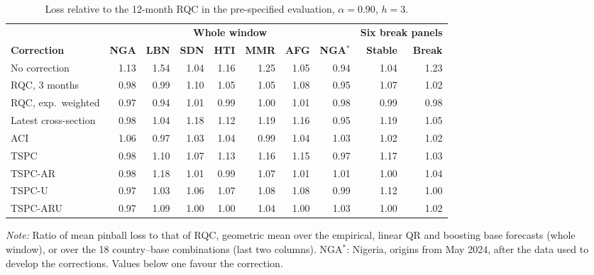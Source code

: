 \begin{table}[t]
\caption{Loss relative to the 12-month RQC in the pre-specified evaluation, $\alpha=0.90$, $h=3$.\label{tab:extcountry}}
\centering\footnotesize\setlength{\tabcolsep}{3pt}
\begin{tabular*}{\textwidth}{@{\extracolsep\fill}l rrrrrrr rr@{}}
\toprule
 & \multicolumn{7}{c}{\textbf{Whole window}} & \multicolumn{2}{c}{\textbf{Six break panels}} \\
\cmidrule(lr){2-8}\cmidrule(l){9-10}
\textbf{Correction} & \textbf{NGA} & \textbf{LBN} & \textbf{SDN} & \textbf{HTI} & \textbf{MMR} & \textbf{AFG} & \textbf{NGA$^\ast$} & \textbf{Stable} & \textbf{Break} \\
\midrule
No correction & 1.13 & 1.54 & 1.04 & 1.16 & 1.25 & 1.05 & 0.94 & 1.04 & 1.23 \\
\addlinespace
RQC, 3 months & 0.98 & 0.99 & 1.10 & 1.05 & 1.05 & 1.08 & 0.95 & 1.07 & 1.02 \\
RQC, exp.\ weighted & 0.97 & 0.94 & 1.01 & 0.99 & 1.00 & 1.01 & 0.98 & 0.99 & 0.98 \\
Latest cross-section & 0.98 & 1.04 & 1.18 & 1.12 & 1.19 & 1.16 & 0.95 & 1.19 & 1.05 \\
ACI & 1.06 & 0.97 & 1.03 & 1.04 & 0.99 & 1.04 & 1.03 & 1.02 & 1.02 \\
\addlinespace
TSPC & 0.98 & 1.10 & 1.07 & 1.13 & 1.16 & 1.15 & 0.97 & 1.17 & 1.03 \\
TSPC-AR & 0.98 & 1.18 & 1.01 & 0.99 & 1.07 & 1.01 & 1.01 & 1.00 & 1.04 \\
TSPC-U & 0.97 & 1.03 & 1.06 & 1.07 & 1.08 & 1.08 & 0.99 & 1.12 & 1.00 \\
TSPC-ARU & 0.97 & 1.09 & 1.00 & 1.00 & 1.04 & 1.00 & 1.03 & 1.00 & 1.02 \\
\bottomrule
\end{tabular*}
\begin{tablenotes}
\item \textit{Note:} Ratio of mean pinball loss to that of RQC, geometric mean over the empirical, linear QR and boosting base forecasts (whole window), or over the 18 country--base combinations (last two columns). NGA$^\ast$: Nigeria, origins from May 2024, after the data used to develop the corrections. Values below one favour the correction.
\end{tablenotes}
\end{table}
